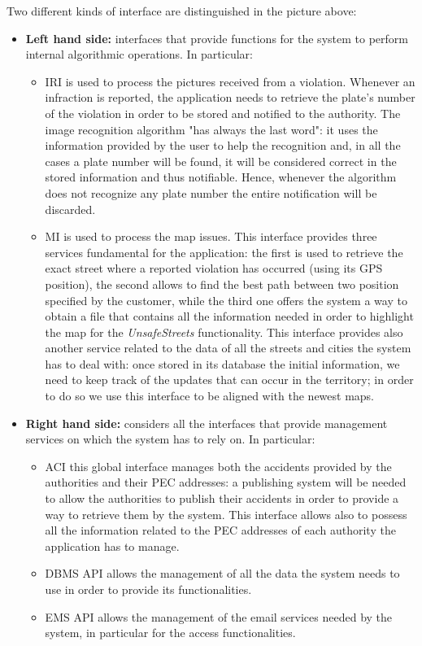 		Two different kinds of interface are distinguished in the picture above:
		\begin{itemize}
			\item \textbf{Left hand side:} interfaces that provide functions for the system to perform internal algorithmic operations. In particular:
			\begin{itemize}
				\item \textsc{IRI} is used to process the pictures received from a violation. Whenever an infraction is reported, the application needs to retrieve the plate's number of the violation in order to be stored and notified to the authority. The image recognition algorithm "has always the last word": it uses the information provided by the user to help the recognition and, in all the cases a plate number will be found, it will be considered correct in the stored information and thus notifiable. Hence, whenever the algorithm does not recognize any plate number the entire notification will be discarded.
			
				\item \textsc{MI} is used to process the map issues. This interface provides three services fundamental for the application: the first is used to retrieve the exact street where a reported violation has occurred (using its GPS position), the second allows to find the best path between two position specified by the customer, while the third one offers the system a way to obtain a file that contains all the information needed in order to highlight the map for the \emph{UnsafeStreets} functionality. This interface provides also another service related to the data of all the streets and cities the system has to deal with: once stored in its database the initial information, we need to keep track of the updates that can occur in the territory; in order to do so we use this interface to be aligned with the newest maps.
			\end{itemize}
			
			\item \textbf{Right hand side:} considers all the interfaces that provide management services on which the system has to rely on. In particular:
			\begin{itemize}
				\item \textsc{ACI} this global interface manages both the accidents provided by the authorities and their PEC addresses: a publishing system will be needed to allow the authorities to publish their accidents in order to provide a way to retrieve them by the system. This interface allows also to possess all the information related to the PEC addresses of each authority the application has to manage.
				
				\item \textsc{DBMS API} allows the management of all the data the system needs to use in order to provide its functionalities.
				
				\item \textsc{EMS API} allows the management of the email services needed by the system, in particular for the access functionalities.
			\end{itemize}
		\end{itemize}
	
